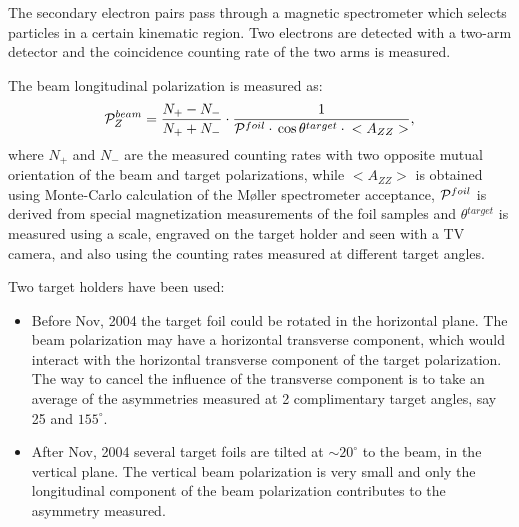 {The secondary electron pairs pass through a magnetic spectrometer
which selects particles in a certain kinematic region. Two electrons
are detected with a two-arm detector and the 
coincidence counting rate of the two arms is measured.

The beam longitudinal polarization is measured as:
\begin{equation}
           {\cal P}^{beam}_{Z} = \frac{N_{+}-N_{-}}{N_{+}+N_{-}}\cdot{}
      \frac{1}{{\cal P}^{foil}\cdot{}\cos\theta{}^{target}\cdot{}<A_{ZZ}>},
\end{equation}
where $N_{+}$ and $N_{-}$ are the measured counting rates with two opposite
mutual orientation of the beam and target polarizations, while 
$<A_{ZZ}>$ is obtained using Monte-Carlo calculation of the M{\o}ller 
spectrometer acceptance, ${\cal P}^{foil}$ is derived from special
magnetization measurements of the foil samples and $\theta{}^{target}$
is measured using a scale, engraved on the target holder and seen
with a TV camera, and also using the counting rates measured at
different target angles.

Two target holders have been used:
\begin{itemize}
  \item Before Nov, 2004 the target foil could be rotated in the horizontal plane.
  The beam polarization may have a horizontal 
  transverse component, which would interact with the horizontal transverse 
  component of the target polarization. The way to cancel the influence
  of the transverse component is to take an average of the asymmetries
  measured at 2 complimentary target angles, say 25 and $155^\circ$. 
  \item After Nov, 2004 several target foils are tilted at $\sim{}20^\circ$
       to the beam, in the vertical plane. The vertical beam polarization is very small
       and only the longitudinal component of the beam polarization
       contributes to the asymmetry measured.
\end{itemize}

} %

